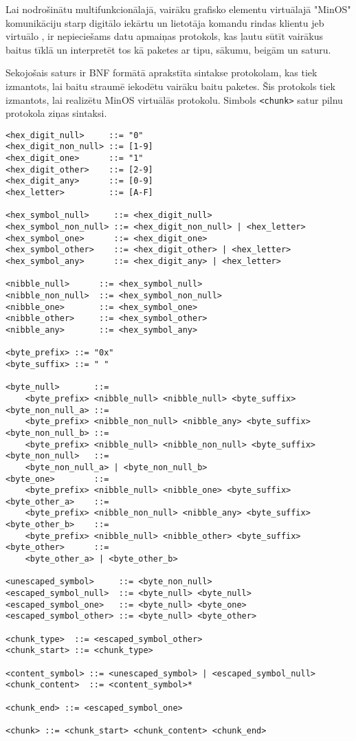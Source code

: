 Lai nodrošinātu multifunkcionālajā, vairāku grafisko elementu virtuālajā
 "MinOS" komunikāciju starp digitālo iekārtu un
lietotāja komandu rindas klientu jeb virtuālo , ir
nepieciešams datu apmaiņas protokols, kas ļautu sūtīt vairākus baitus tīklā un
interpretēt tos kā paketes ar tipu, sākumu, beigām un saturu.

Sekojošais saturs ir BNF formātā aprakstīta sintakse protokolam, kas tiek
izmantots, lai baitu straumē iekodētu vairāku baitu paketes. Šis protokols tiek
izmantots, lai realizētu MinOS virtuālās 
protokolu. Simbols \lstinline!<chunk>! satur pilnu protokola ziņas sintaksi. 

\begin{lstlisting}
<hex_digit_null>     ::= "0"
<hex_digit_non_null> ::= [1-9]
<hex_digit_one>      ::= "1"
<hex_digit_other>    ::= [2-9]
<hex_digit_any>      ::= [0-9]
<hex_letter>         ::= [A-F]

<hex_symbol_null>     ::= <hex_digit_null>
<hex_symbol_non_null> ::= <hex_digit_non_null> | <hex_letter>
<hex_symbol_one>      ::= <hex_digit_one>
<hex_symbol_other>    ::= <hex_digit_other> | <hex_letter>
<hex_symbol_any>      ::= <hex_digit_any> | <hex_letter>

<nibble_null>      ::= <hex_symbol_null>
<nibble_non_null>  ::= <hex_symbol_non_null>
<nibble_one>       ::= <hex_symbol_one>
<nibble_other>     ::= <hex_symbol_other>
<nibble_any>       ::= <hex_symbol_any>

<byte_prefix> ::= "0x"
<byte_suffix> ::= " "

<byte_null>       ::= 
    <byte_prefix> <nibble_null> <nibble_null> <byte_suffix>
<byte_non_null_a> ::= 
    <byte_prefix> <nibble_non_null> <nibble_any> <byte_suffix>
<byte_non_null_b> ::= 
    <byte_prefix> <nibble_null> <nibble_non_null> <byte_suffix>
<byte_non_null>   ::= 
    <byte_non_null_a> | <byte_non_null_b>
<byte_one>        ::= 
    <byte_prefix> <nibble_null> <nibble_one> <byte_suffix>
<byte_other_a>    ::= 
    <byte_prefix> <nibble_non_null> <nibble_any> <byte_suffix>
<byte_other_b>    ::= 
    <byte_prefix> <nibble_null> <nibble_other> <byte_suffix>
<byte_other>      ::= 
    <byte_other_a> | <byte_other_b>

<unescaped_symbol>     ::= <byte_non_null>
<escaped_symbol_null>  ::= <byte_null> <byte_null>
<escaped_symbol_one>   ::= <byte_null> <byte_one>
<escaped_symbol_other> ::= <byte_null> <byte_other>

<chunk_type>  ::= <escaped_symbol_other>
<chunk_start> ::= <chunk_type>

<content_symbol> ::= <unescaped_symbol> | <escaped_symbol_null>
<chunk_content>  ::= <content_symbol>*

<chunk_end> ::= <escaped_symbol_one>

<chunk> ::= <chunk_start> <chunk_content> <chunk_end>
\end{lstlisting}

